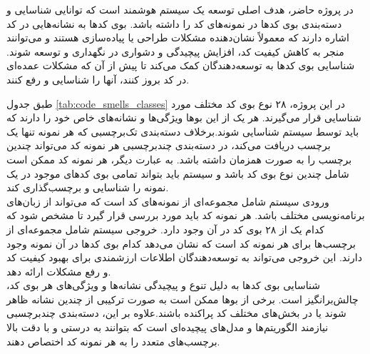 در پروژه حاضر، هدف اصلی توسعه یک سیستم هوشمند است که توانایی شناسایی و دسته‌بندی بوی کدها در نمونه‌های کد را داشته باشد. بوی کدها به نشانه‌هایی در کد اشاره دارند که معمولاً نشان‌دهنده مشکلات طراحی یا پیاده‌سازی هستند و می‌توانند منجر به کاهش کیفیت کد، افزایش پیچیدگی و دشواری در نگهداری و توسعه شوند. شناسایی بوی کدها به توسعه‌دهندگان کمک می‌کند تا پیش از آن که مشکلات عمده‌ای در کد بروز کنند، آنها را شناسایی و رفع کنند.

طبق جدول \ref{tab:code_smells_classes}
در این پروژه، ۲۸ نوع بوی کد مختلف مورد شناسایی قرار می‌گیرند. هر یک از این بوها ویژگی‌ها و نشانه‌های خاص خود را دارند که باید توسط سیستم شناسایی شوند.برخلاف دسته‌بندی تک‌برچسبی که هر نمونه تنها یک برچسب دریافت می‌کند، در دسته‌بندی چندبرچسبی هر نمونه کد می‌تواند چندین برچسب را به صورت همزمان داشته باشد. به عبارت دیگر، هر نمونه کد ممکن است شامل چندین نوع بوی کد باشد و سیستم باید بتواند تمامی بوی کدهای موجود در یک نمونه را شناسایی و برچسب‌گذاری کند.
\\
ورودی سیستم شامل مجموعه‌ای از نمونه‌های کد است که می‌تواند از زبان‌های برنامه‌نویسی مختلف باشد. هر نمونه کد باید مورد بررسی قرار گیرد تا مشخص شود که کدام یک از ۲۸ بوی کد در آن وجود دارد.
خروجی سیستم شامل مجموعه‌ای از برچسب‌ها برای هر نمونه کد است که نشان می‌دهد کدام بوی کدها در آن نمونه وجود دارند. این خروجی می‌تواند به توسعه‌دهندگان اطلاعات ارزشمندی برای بهبود کیفیت کد و رفع مشکلات ارائه دهد.
\\
شناسایی بوی کدها به دلیل تنوع و پیچیدگی نشانه‌ها و ویژگی‌های هر بوی کد، چالش‌برانگیز است. برخی از بوها ممکن است به صورت ترکیبی از چندین نشانه ظاهر شوند یا در بخش‌های مختلف کد پراکنده باشند.علاوه بر این، دسته‌بندی چندبرچسبی نیازمند الگوریتم‌ها و مدل‌های پیچیده‌ای است که بتوانند به درستی و با دقت بالا برچسب‌های متعدد را به هر نمونه کد اختصاص دهند.

